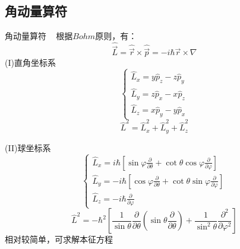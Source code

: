 \subsection{角动量算符}

\begin{frame} {角动量算符}
    \解~ 根据$Bohm$原则，有：
    $$\hat{\vec{L}}=\hat{\vec{r}}\times\hat{\vec{p}}= -i\hbar \vec{r}\times\nabla$$
    (I)直角坐标系
    $$
    \left \{
    \begin{array}{l} 
        \hat{L}_x=y\hat{p}_z-z\hat{p}_y  \\ 
        \hat{L}_y=z\hat{p}_x-x\hat{p}_z  \\ 
        \hat{L}_z=x\hat{p}_y-y\hat{p}_x 
    \end{array}
    \right.
    $$ \vspace{0.3em}
    $$ \hat{L}^2= \hat{L}_x ^2+ \hat{L}_y ^2 +\hat{L}_z ^2  $$
\end{frame} 

\begin{frame} 
    (II)球坐标系\\
    $$
    \left\{\begin{array}{l}
        \hat{L}_{x}=i \hbar\left[\sin \varphi \frac{\partial}{\partial \theta}+\cot \theta \cos \varphi \frac{\partial}{\partial \varphi}\right] \\
        \hat{L}_{y}=-i \hbar\left[\cos \varphi \frac{\partial}{\partial \theta}+\cot \theta \sin \varphi \frac{\partial}{\partial \varphi}\right] \\
        \hat{L}_{z}=-i \hbar \frac{\partial}{\partial \varphi}
        \end{array}\right.
    $$
    $$ \hat{L}^{2}=-\hbar^{2}\left[\frac{1}{\sin \theta} \frac{\partial}{\partial \theta}\left(\sin \theta \frac{\partial}{\partial \theta}\right)+\frac{1}{\sin ^{2} \theta} \frac{\partial^{2}}{\partial \varphi^{2}}\right] $$
    相对较简单，可求解本征方程
\end{frame} 

